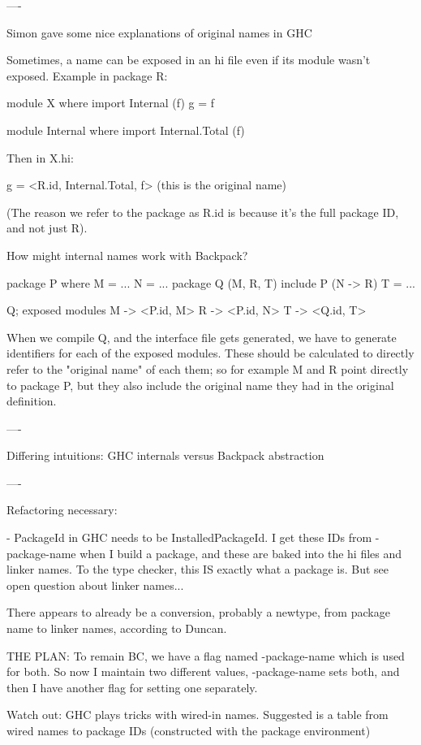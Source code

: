 \documentclass{article}
\begin{document}
----

Simon gave some nice explanations of original names in GHC

Sometimes, a name can be exposed in an hi file even if its module
wasn't exposed. Example in package R:

    module X where
    import Internal (f)
    g = f

    module Internal where
    import Internal.Total (f)

Then in X.hi:

    g = <R.id, Internal.Total, f> (this is the original name)

(The reason we refer to the package as R.id is because it's the
full package ID, and not just R).

How might internal names work with Backpack?

    package P where
        M = ...
        N = ...
    package Q (M, R, T)
        include P (N -> R)
        T = ...

    Q; exposed modules
        M -> <P.id, M>
        R -> <P.id, N>
        T -> <Q.id, T>

When we compile Q, and the interface file gets generated, we have
to generate identifiers for each of the exposed modules.  These should
be calculated to directly refer to the "original name" of each them;
so for example M and R point directly to package P, but they also
include the original name they had in the original definition.

----

Differing intuitions: GHC internals versus Backpack abstraction

----

Refactoring necessary:

    - PackageId in GHC needs to be InstalledPackageId.  I get these IDs
      from -package-name when I build a package, and these are baked
      into the hi files and linker names.  To the type checker, this
      IS exactly what a package is.  But see open question about linker
      names...

        There appears to already be a conversion, probably a newtype,
        from package name to linker names, according to Duncan.

      THE PLAN: To remain BC, we have a flag named -package-name which
      is used for both.  So now I maintain two different values,
      -package-name sets both, and then I have another flag for setting
      one separately.

      Watch out: GHC plays tricks with wired-in names. Suggested is a
      table from wired names to package IDs (constructed with the
      package environment)
\end{document}
